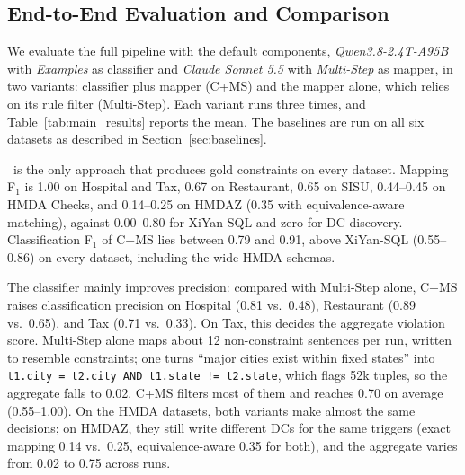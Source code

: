 \subsection{End-to-End Evaluation and Comparison}
\label{sec:endtoend}

We evaluate the full pipeline with the default components, \emph{Qwen3.8-2.4T-A95B} with \emph{Examples} as classifier and \emph{Claude Sonnet 5.5} with \emph{Multi-Step} as mapper, in two variants: classifier plus mapper (C+MS) and the mapper alone, which relies on its rule filter (Multi-Step). Each variant runs three times, and Table~\ref{tab:main_results} reports the mean. The baselines are run on all six datasets as described in Section~\ref{sec:baselines}.

\begin{table}[!ht]
  \centering
  \small
  \setlength{\tabcolsep}{4pt}
  \resizebox{\columnwidth}{!}{%
  
  }%
\caption{End-to-end comparison of \system\ (C+MS and Multi-Step; mean of three runs) and the baselines. \textbf{Profiling}: DC discovery from data alone; \textbf{Text2SQL}: XiYan-SQL adapted to generate violation queries; DNF, did not finish within the time and memory limits; n/a, metric not applicable; bold, best F$_1$ per metric and dataset.}
  \label{tab:main_results}
\end{table}

\system\ is the only approach that produces gold constraints on every dataset. Mapping F$_1$ is 1.00 on Hospital and Tax, 0.67 on Restaurant, 0.65 on SISU, 0.44--0.45 on HMDA Checks, and 0.14--0.25 on HMDAZ (0.35 with equivalence-aware matching), against 0.00--0.80 for XiYan-SQL and zero for DC discovery. Classification F$_1$ of C+MS lies between 0.79 and 0.91, above XiYan-SQL (0.55--0.86) on every dataset, including the wide HMDA schemas.

The classifier mainly improves precision: compared with Multi-Step alone, C+MS raises classification precision on Hospital (0.81 vs.\ 0.48), Restaurant (0.89 vs.\ 0.65), and Tax (0.71 vs.\ 0.33). On Tax, this decides the aggregate violation score. Multi-Step alone maps about 12 non-constraint sentences per run, written to resemble constraints; one turns ``major cities exist within fixed states'' into \texttt{t1.city = t2.city AND t1.state != t2.state}, which flags 52k tuples, so the aggregate falls to 0.02. C+MS filters most of them and reaches 0.70 on average (0.55--1.00). On the HMDA datasets, both variants make almost the same decisions; on HMDAZ, they still write different DCs for the same triggers (exact mapping 0.14 vs.\ 0.25, equivalence-aware 0.35 for both), and the aggregate varies from 0.02 to 0.75 across runs.


